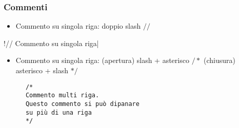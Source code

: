 \begin{frame}[fragile]\frametitle{Commenti}

  \begin{itemize}
   \item Commento su singola riga: doppio slash $//$
  \end{itemize}

  \begin{center}
    \begin{minipage}[c]{8cm}
      \begin{JavaCodePlain}[commandchars=\\!|]
	\Green!// Commento su singola riga|
	\end{JavaCodePlain}
    \end{minipage}  
  \end{center}

  \begin{itemize}
   \item Commento su singola riga: (apertura) slash + asterisco $/*$ (chiusura) asterisco + slash $*/$
  \end{itemize}

  \begin{center}
    \begin{minipage}[c]{8cm}
      {\color{green!50!black}
	\begin{verbatim}
	  /*
	  Commento multi riga.
	  Questo commento si può dipanare
	  su più di una riga
	  */
	\end{verbatim}
      }
    \end{minipage}  
  \end{center}
\end{frame}

